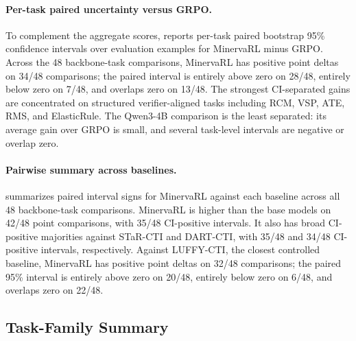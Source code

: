 \paragraph{Per-task paired uncertainty versus GRPO.}
To complement the aggregate scores,  reports per-task paired bootstrap 95\% confidence intervals over evaluation examples for MinervaRL minus GRPO. Across the 48 backbone-task comparisons, MinervaRL has positive point deltas on 34/48 comparisons; the paired interval is entirely above zero on 28/48, entirely below zero on 7/48, and overlaps zero on 13/48. The strongest CI-separated gains are concentrated on structured verifier-aligned tasks including RCM, VSP, ATE, RMS, and ElasticRule. The Qwen3-4B comparison is the least separated: its average gain over GRPO is small, and several task-level intervals are negative or overlap zero.

\paragraph{Pairwise summary across baselines.}
 summarizes paired interval signs for MinervaRL against each baseline across all 48 backbone-task comparisons. MinervaRL is higher than the base models on 42/48 point comparisons, with 35/48 CI-positive intervals. It also has broad CI-positive majorities against STaR-CTI and DART-CTI, with 35/48 and 34/48 CI-positive intervals, respectively. Against LUFFY-CTI, the closest controlled baseline, MinervaRL has positive point deltas on 32/48 comparisons; the paired 95\% interval is entirely above zero on 20/48, entirely below zero on 6/48, and overlaps zero on 22/48.

\subsection{Task-Family Summary}
\label{sec:task-family-summary}

